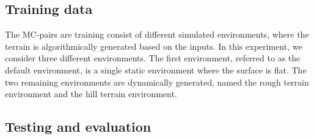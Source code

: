     \subsection{Training data}
        The MC-pairs are training consist of different simulated environments, where the terrain is algorithmically generated based on the inputs. In this experiment, we consider three different environments. The first environment, referred to as the default environment, is a single static environment where the surface is flat. The two remaining environments are dynamically generated, named the rough terrain environment and the hill terrain environment. 
    \subsection{Testing and evaluation}